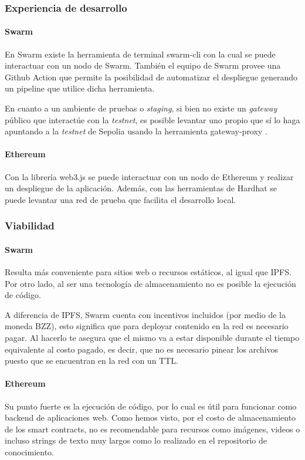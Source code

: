 \subsubsection{Experiencia de desarrollo} %

\paragraph{Swarm}
En Swarm existe la herramienta de terminal swarm-cli \cite{swarm-cli} con la cual se puede interactuar con un nodo de Swarm. También el equipo de Swarm provee una Github Action que permite la posibilidad de automatizar el despliegue generando un pipeline que utilice dicha herramienta.

En cuanto a un ambiente de pruebas o \textit{staging}, si bien no existe un \textit{gateway} público que interactúe con la \textit{testnet}, es posible levantar uno propio que sí lo haga apuntando a la \textit{testnet} de Sepolia usando la herramienta gateway-proxy \cite{gateway-proxy}.

\paragraph{Ethereum}
Con la librería web3.js se puede interactuar con un nodo de Ethereum y realizar un despliegue de la aplicación. Además, con las herramientas de Hardhat se puede levantar una red de prueba que facilita el desarrollo local.

\subsubsection{Viabilidad}

\paragraph{Swarm}
Resulta más conveniente para sitios web o recursos estáticos, al igual que IPFS. Por otro lado, al ser una tecnología de almacenamiento no es posible la ejecución de código.

A diferencia de IPFS, Swarm cuenta con incentivos incluidos (por medio de la moneda BZZ), esto significa que para deployar contenido en la red es necesario pagar. Al hacerlo te asegura que el mismo va a estar disponible durante el tiempo equivalente al costo pagado, es decir, que no es necesario pinear los archivos puesto que se encuentran en la red con un TTL.

\paragraph{Ethereum}
Su punto fuerte es la ejecución de código, por lo cual es útil para funcionar como backend de aplicaciones web. Como hemos visto, por el costo de almacenamiento de los smart contracts, no es recomendable para recursos como imágenes, videos o incluso strings de texto muy largos como lo realizado en el repositorio de conocimiento. 

